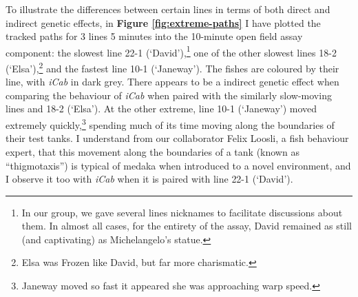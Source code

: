 \documentclass[
]{book}
\begin{document}
To illustrate the differences between certain lines in terms of both direct and indirect genetic effects, in \textbf{Figure \ref{fig:extreme-paths}} I have plotted the tracked paths for 3 lines 5 minutes into the 10-minute open field assay component: the slowest line \textcolor{22-1 (‘David’)_FB737A}{22-1 (‘David’)},\footnote{In our group, we gave several lines nicknames to facilitate discussions about them. In almost all cases, for the entirety of the assay, David remained as still (and captivating) as Michelangelo's statue.} one of the other slowest lines \textcolor{18-2 (‘Elsa’)_FF66A6}{18-2 (‘Elsa’)},\footnote{Elsa was Frozen like David, but far more charismatic.} and the fastest line \textcolor{10-1 (‘Janeway’)_F8766D}{10-1 (‘Janeway’)}. The fishes are coloured by their line, with \emph{\textcolor{iCab_424B4D}{iCab}} in dark grey. There appears to be a indirect genetic effect when comparing the behaviour of \emph{\textcolor{iCab_424B4D}{iCab}} when paired with the similarly slow-moving lines and \textcolor{18-2 (‘Elsa’)_FF66A6}{18-2 (‘Elsa’)}. At the other extreme, line \textcolor{10-1 (‘Janeway’)_F8766D}{10-1 (‘Janeway’)} moved extremely quickly,\footnote{Janeway moved so fast it appeared she was approaching warp speed.} spending much of its time moving along the boundaries of their test tanks. I understand from our collaborator Felix Loosli, a fish behaviour expert, that this movement along the boundaries of a tank (known as ``thigmotaxis'') is typical of medaka when introduced to a novel environment, and I observe it too with \emph{\textcolor{iCab_424B4D}{iCab}} when it is paired with line \textcolor{22-1 (‘David’)_FB737A}{22-1 (‘David’)}.
\end{document}
